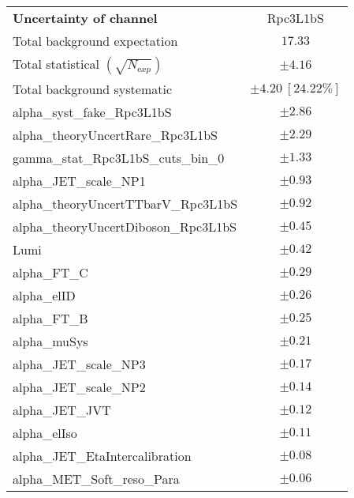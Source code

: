 
\begin{table}
\begin{center}
\setlength{\tabcolsep}{0.0pc}
\begin{tabular*}{\textwidth}{@{\extracolsep{\fill}}lc}
\noalign{\smallskip}\hline\noalign{\smallskip}
{\bfseries Uncertainty of channel}                                    & Rpc3L1bS            \\
\noalign{\smallskip}\hline\noalign{\smallskip}
Total background expectation             &  $17.33$       \\
\noalign{\smallskip}\hline\noalign{\smallskip}
Total statistical $(\sqrt{N_{\mathrm exp}})$              & $\pm 4.16$       \\
Total background systematic               & $\pm 4.20\ [24.22\%] $             \\
\noalign{\smallskip}\hline\noalign{\smallskip}
\noalign{\smallskip}\hline\noalign{\smallskip}
alpha\_syst\_fake\_Rpc3L1bS         & $\pm 2.86$       \\
alpha\_theoryUncertRare\_Rpc3L1bS         & $\pm 2.29$       \\
gamma\_stat\_Rpc3L1bS\_cuts\_bin\_0         & $\pm 1.33$       \\
alpha\_JET\_scale\_NP1         & $\pm 0.93$       \\
alpha\_theoryUncertTTbarV\_Rpc3L1bS         & $\pm 0.92$       \\
alpha\_theoryUncertDiboson\_Rpc3L1bS         & $\pm 0.45$       \\
Lumi         & $\pm 0.42$       \\
alpha\_FT\_C         & $\pm 0.29$       \\
alpha\_elID         & $\pm 0.26$       \\
alpha\_FT\_B         & $\pm 0.25$       \\
alpha\_muSys         & $\pm 0.21$       \\
alpha\_JET\_scale\_NP3         & $\pm 0.17$       \\
alpha\_JET\_scale\_NP2         & $\pm 0.14$       \\
alpha\_JET\_JVT         & $\pm 0.12$       \\
alpha\_elIso         & $\pm 0.11$       \\
alpha\_JET\_EtaIntercalibration         & $\pm 0.08$       \\
alpha\_MET\_Soft\_reso\_Para         & $\pm 0.06$       \\

\end{tabular*}
\end{center}
\end{table}
